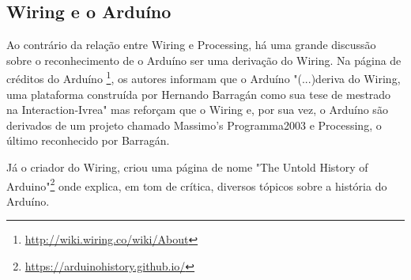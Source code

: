 \subsection{Wiring e o Arduíno}

Ao contrário da relação entre Wiring e Processing, há uma grande discussão sobre o reconhecimento de o Arduíno ser uma derivação do Wiring.
Na página de créditos do Arduíno \footnote{\url{http://wiki.wiring.co/wiki/About}}, os autores informam que o Arduíno "(...)deriva do Wiring, uma plataforma construída por Hernando Barragán como sua tese de mestrado na Interaction-Ivrea" mas reforçam que o Wiring e, por sua vez, o Arduíno são derivados de um projeto chamado Massimo's Programma2003 e Processing, o último reconhecido por Barragán. 

Já o criador do Wiring, criou uma página de nome "The Untold History of Arduino"\footnote{\url{https://arduinohistory.github.io/}} onde explica, em tom de crítica, diversos tópicos sobre a história do Arduíno.
